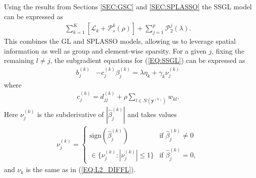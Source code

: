 \documentclass{article}
\numberwithin{equation}{section}
\theoremstyle{plain}
\begin{document}
Using the results from Sections \ref{SEC:GSC} and \ref{SEC:SPLASSO} the SSGL
model can be expressed as
\begin{align}
\label{EQ:SSGL}
\sum_{k=1}^K \left[ \mathcal{L}_k
+ \mathcal{P}_s^{k}(\rho) \right] + \sum_{j=1}^p\mathcal{P}_2^{j}(\lambda).
\end{align}
\noindent This combines the GL and SPLASSO models, allowing us to leverage
spatial information as well as group and element-wise sparsity.  For a given
$j$, fixing the remaining $l \neq j$, the subgradient equations for
(\ref{EQ:SSGL}) can be expressed as
\begin{align}
\label{EQ:SUBG1}
b_j^{(k)} & - c_j^{(k)} \beta_j^{(k)}
 = 
\lambda \eta_k + \gamma_k \nu_j^{(k)} 
\end{align}
\noindent where 
\begin{align}
\label{EQ:SPDEN}
c_j^{(k)} = d_{jj}^{(k)} + \rho \sum_{l \in
N(\mathbf{y}^{(k)})} w_{kl}. 
\end{align}
\noindent Here $\nu_j^{(k)}$ is the subderivative of
$|\hat{\beta}_j^{(k)}|$ and takes values
\begin{align}
\label{EQ:SG_L1}
\nu_j^{(k)} =
\left\{
\begin{array}{cc}
\mbox{sign}(\hat{\beta}_j^{(k)}) & \mbox{if } \hat{\beta}_j^{(k)} \neq 0 \\
\in \{\nu_j^{(k)}: |\nu_j^{(k)}| \leq 1 \} & \mbox{if } \hat{\beta}_j^{(k)} =
0,
\end{array}
\right.
\end{align}
\noindent and $\nu_k$ is the same as in (\ref{EQ:L2_DIFFL}). 
\end{document}
